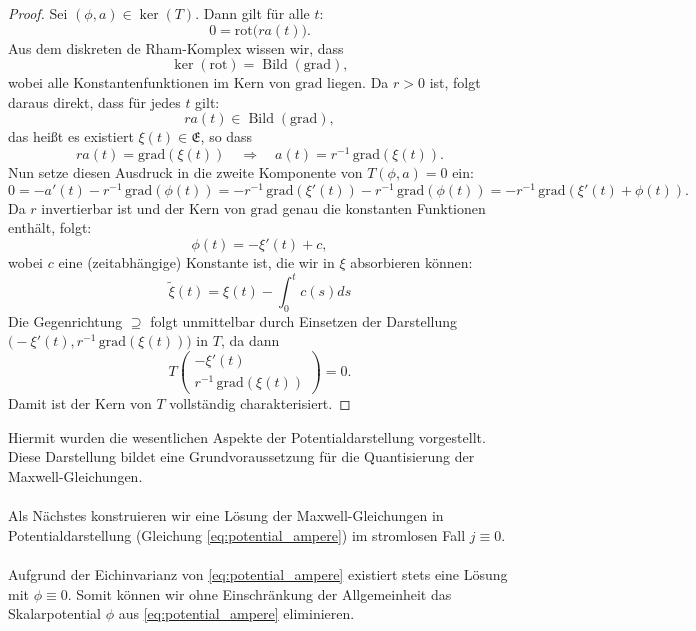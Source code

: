 \documentclass[11pt,a4paper,leqno]{report}
\numberwithin{equation}{chapter}
\begin{document}
\begin{proof}
	Sei \((\phi, a) \in \ker(T)\). Dann gilt für alle \(t\):
	\[
	0 = \mathrm{rot} \bigl(r a(t)\bigr).
	\]
	Aus dem diskreten de Rham-Komplex wissen wir, dass
	\[
	\ker(\mathrm{rot}) =  \operatorname{Bild}(\mathrm{grad}),
	\]
	wobei alle Konstantenfunktionen im Kern von \(\mathrm{grad}\) liegen.
	Da \(r > 0\) ist, folgt daraus direkt, dass für jedes \(t\) gilt:
	\[
	r a(t) \in  \operatorname{Bild}(\mathrm{grad}),
	\]
	das heißt es existiert \(\xi(t) \in \mathfrak{E}\), so dass
	\[
	r a(t) = \mathrm{grad}(\xi(t)) \quad \Rightarrow \quad a(t) = r^{-1}\, \mathrm{grad}(\xi(t)).
	\]
	Nun setze diesen Ausdruck in die zweite Komponente von \(T(\phi,a) = 0\) ein:
	\[
	0 = -a'(t) - r^{-1}\, \mathrm{grad}(\phi(t)) = - r^{-1}\, \mathrm{grad}(\xi'(t)) - r^{-1}\, \mathrm{grad}(\phi(t)) = - r^{-1}\, \mathrm{grad}(\xi'(t) + \phi(t)).
	\]
	Da \(r\) invertierbar ist und der Kern von \(\mathrm{grad}\) genau die konstanten Funktionen enthält, folgt:
	\[
	\phi(t) = - \xi'(t) + c,
	\]
	wobei \(c\) eine (zeitabhängige) Konstante ist, die wir in \(\xi\) absorbieren können:
	\[
	\tilde{\xi}(t) = \xi(t) - \int_{0}^{t}c(s)ds
	\]
	Die Gegenrichtung \(\supseteq\) folgt unmittelbar durch Einsetzen der Darstellung \(\bigl(-\xi'(t), r^ {-1}\, \mathrm{grad}(\xi(t))\bigr)\) in \(T\), da dann
	\[
	T\begin{pmatrix} -\xi'(t) \\ r^{-1}\, \mathrm{grad}(\xi(t)) \end{pmatrix} = 0.
	\]
	Damit ist der Kern von \(T\) vollständig charakterisiert.
\end{proof}
\noindent
Hiermit wurden die wesentlichen Aspekte der Potentialdarstellung vorgestellt. Diese Darstellung bildet eine Grundvoraussetzung für die Quantisierung der Maxwell-Gleichungen.\\
\\
Als Nächstes konstruieren wir eine Lösung der Maxwell-Gleichungen in Potentialdarstellung (Gleichung \eqref{eq:potential_ampere}) im stromlosen Fall \( j \equiv 0 \).\\
\\
Aufgrund der Eichinvarianz von \eqref{eq:potential_ampere} existiert stets eine Lösung mit \(\phi \equiv 0\). Somit können wir ohne Einschränkung der Allgemeinheit das Skalarpotential \(\phi\) aus \eqref{eq:potential_ampere}  eliminieren.
\end{document}
